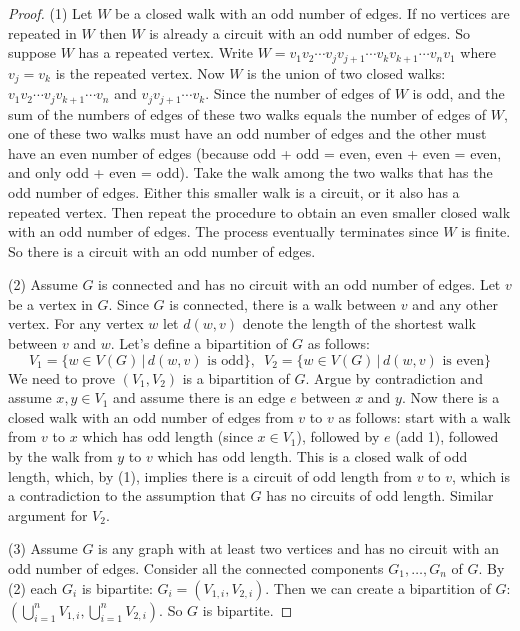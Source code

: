 \documentclass[14pt]{extarticle}
\begin{document}
\begin{proof}
    (1) Let \(W\) be a closed walk with an odd number of edges. If no vertices are repeated in \(W\) then \(W\) is already a
    circuit with an odd number of edges. So suppose \(W\) has a repeated vertex. Write \(W = v_1v_2 \cdots v_jv_{j+1} \cdots
    v_kv_{k+1} \cdots v_nv_1\) where \(v_j = v_k\) is the repeated vertex. Now \(W\) is the union of two closed walks: \(v_1v_2
    \cdots v_jv_{k+1} \cdots v_n\) and \(v_jv_{j+1} \cdots v_k\). Since the number of edges of \(W\) is odd, and the sum of the
    numbers of edges of these two walks equals the number of edges of \(W\), one of these two walks must have an odd number of
    edges and the other must have an even number of edges (because odd + odd = even, even + even = even, and only odd + even =
    odd). Take the walk among the two walks that has the odd number of edges. Either this smaller walk is a circuit, or it
    also has a repeated vertex. Then repeat the procedure to obtain an even smaller closed walk with an odd number of
    edges. The process eventually terminates since \(W\) is finite. So there is a circuit with an odd number of edges.

    (2) Assume \(G\) is connected and has no circuit with an odd number of edges. Let \(v\) be a vertex in \(G\). Since \(G\)
    is connected, there is a walk between \(v\) and any other vertex. For any vertex \(w\) let \(d(w, v)\) denote the length
    of the shortest walk between \(v\) and \(w\). Let's define a bipartition of \(G\) as follows:
    \[
        V_1 = \{w \in V(G) \, | \, d(w, v) \text{ is odd}\}, \,\,\, V_2 = \{w \in V(G) \, | \, d(w, v) \text{ is even}\}
    \]
    We need to prove \((V_1, V_2)\) is a bipartition of \(G\). Argue by contradiction and assume \(x,y \in V_1\) and assume
    there is an edge \(e\) between \(x\) and \(y\). Now there is a closed walk with an odd number of edges from \(v\) to \(v\) as
    follows: start with a walk from \(v\) to \(x\) which has odd length (since \(x \in V_1\)), followed by \(e\) (add 1),
    followed by the walk from \(y\) to \(v\) which has odd length. This is a closed walk of odd length, which, by (1), implies
    there is a circuit of odd length from \(v\) to \(v\), which is a contradiction to the assumption that \(G\) has no circuits
    of odd length. Similar argument for \(V_2\).

    (3) Assume \(G\) is any graph with at least two vertices and has no circuit with an odd number of edges. Consider all the
    connected components \(G_1, \ldots, G_n\) of \(G\). By (2) each \(G_i\) is bipartite: \(G_i = (V_{1,i}, V_{2,i})\). Then
    we can create a bipartition of \(G\): \((\bigcup_{i=1}^n V_{1,i}, \bigcup_{i=1}^n V_{2,i})\). So \(G\) is bipartite.
\end{proof}
\end{document}

